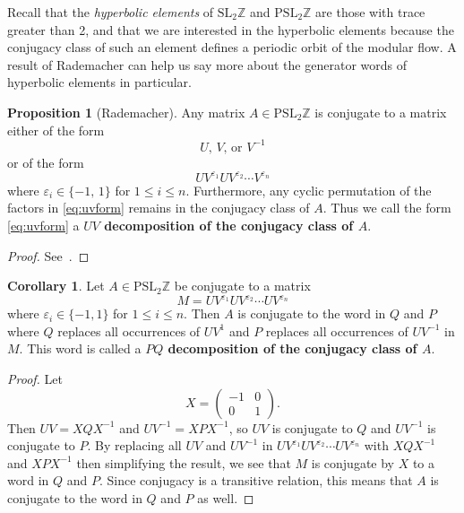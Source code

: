 \documentclass[12pt,twoside]{reedthesis}
\theoremstyle{definition}
\newtheorem{cor}[thm]{Corollary}
\newtheorem{prop}[thm]{Proposition}
\newcommand{\Z}{\mathbb{Z}}
\newcommand{\SLZ}{\mathrm{SL}_2{\Z}}
\newcommand{\PSLZ}{\mathrm{PSL}_2{\Z}}
\newcommand{\defnphrase}[1]{\textbf{#1}}
\begin{document}
Recall that the \emph{hyperbolic elements} of $\SLZ$ and $\PSLZ$ are those with trace greater than 2, and that we are interested in the hyperbolic elements because the conjugacy class of such an element defines a periodic orbit of the modular flow. A result of Rademacher can help us say more about the generator words of hyperbolic elements in particular.

\begin{prop}[Rademacher]
  Any matrix $A \in \PSLZ$ is conjugate to a matrix either of the form
  \begin{equation}\label{eq:uvform_elliptic}
    \text{$U$, $V$, or $V^{-1}$}
  \end{equation}
  or of the form
  \begin{equation}\label{eq:uvform}
    U V^{\varepsilon_1} U V^{\varepsilon_2} \cdots V^{\varepsilon_{n}}
  \end{equation}
  where $\varepsilon_i \in \{-1,\, 1\}$ for $1 \leq i \leq n$.
  Furthermore, any cyclic permutation of the factors in \eqref{eq:uvform} remains in the conjugacy class of $A$.
  Thus we call the form \eqref{eq:uvform} a \defnphrase{$UV$ decomposition of the conjugacy class of $A$}.
\end{prop}

\begin{proof}
  See~\cite[56--57]{rademacher1972}.
\end{proof}

\vspace{0.5em}  %
\begin{cor}\label{prop:pq_decomposition}
  Let $A \in \PSLZ$ be conjugate to a matrix
  \begin{equation*}
    M = UV^{\varepsilon_1} UV^{\varepsilon_2} \cdots UV^{\varepsilon_n}
  \end{equation*}
  where $\varepsilon_i \in \{-1, 1\}$ for $1 \leq i \leq n$.
  Then $A$ is conjugate to the word in $Q$ and $P$ where $Q$ replaces all occurrences of $UV^1$ and $P$ replaces all occurrences of $UV^{-1}$ in $M$.
  This word is called a \defnphrase{$PQ$ decomposition of the conjugacy class of $A$}.
\end{cor}

\begin{proof}
  Let 
  \begin{equation*}
    X = \begin{pmatrix}
      -1 & 0 \\
      0 & 1
    \end{pmatrix}.
  \end{equation*}
  Then $UV = XQX^{-1}$ and $UV^{-1} = XPX^{-1}$, so $UV$ is conjugate to $Q$ and $UV^{-1}$ is conjugate to $P$. 
  By replacing all $UV$ and $UV^{-1}$ in $UV^{\varepsilon_1} UV^{\varepsilon_2} \cdots UV^{\varepsilon_n}$ with $XQX^{-1}$ and $XPX^{-1}$ then simplifying the result, we see that $M$ is conjugate by $X$ to a word in $Q$ and $P$.
  Since conjugacy is a transitive relation, this means that $A$ is conjugate to the word in $Q$ and $P$ as well.
\end{proof}
\end{document}
